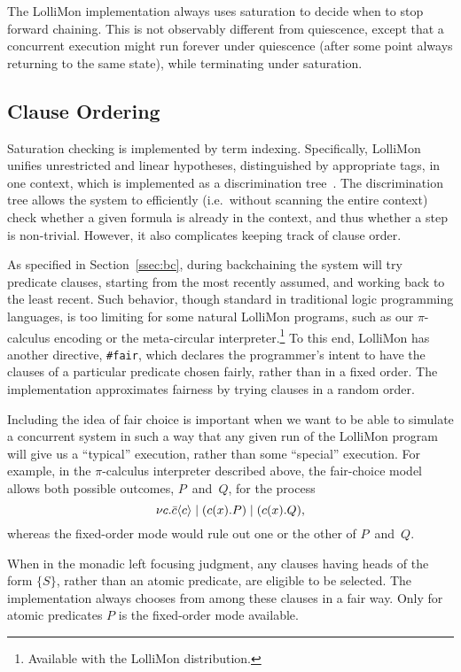 \documentclass{sig-alt}
\begin{document}
The LolliMon implementation always uses saturation to decide when to
stop forward chaining.  This is not observably different from quiescence,
except that a concurrent execution might run forever under quiescence
(after some point always returning to the same state), while terminating
under saturation.

\subsection{Clause Ordering}
\label{ssec:ordering}
Saturation checking is implemented by
term indexing.  Specifically, LolliMon unifies unrestricted and linear
hypotheses, distinguished by
appropriate tags, in one context, which is implemented as a discrimination
tree~\cite{RSV01}.  The discrimination tree allows the
system to efficiently (i.e.\ without scanning the entire context) check
whether a given formula is already in the context, and thus whether a
step is non-trivial. However, it also complicates keeping track of clause
order.  

As specified in Section~\ref{ssec:bc}, during backchaining the
system will try predicate clauses, starting from
the most recently assumed, and working back to the least recent.
Such behavior, though standard in traditional logic
programming languages, is too limiting for some natural LolliMon
programs, such as our $\pi$-calculus encoding or the meta-circular
interpreter.\footnote{Available with the LolliMon distribution.}  To this
end, LolliMon has another directive, \texttt{\#{}fair}, which
declares the programmer's intent to have the clauses of a particular
predicate chosen fairly, rather than in a fixed order. The
implementation approximates fairness by trying clauses in a random
order.

Including the idea of fair choice is important when we want to be
able to simulate a concurrent system in such a way that any given
run of the LolliMon program will give us a ``typical'' execution,
rather than some ``special'' execution.  For example, in the $\pi$-calculus
interpreter described above, the fair-choice model allows both
possible outcomes, $P$~and~$Q$, for the process
$$
  \nu c.\bar{c}\langle c\rangle \mid (c(x).P) \mid (c(x).Q),
$$
whereas the fixed-order mode
would
rule out one or the other of $P$~and~$Q$.

When in the monadic left focusing judgment, any clauses having heads
of the form $\{S\}$, rather than an atomic predicate, are eligible
to be selected.  The implementation
always chooses from among these clauses in a fair way. Only for atomic
predicates $P$ is the fixed-order mode available.
\end{document}
